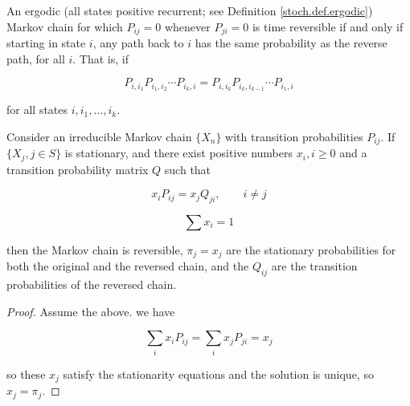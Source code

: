 \begin{theorem}An ergodic (all states positive recurrent; see Definition \ref{stoch.def.ergodic}) Markov chain for which \(P_{ij}=0\) whenever \(P_{ji}=0\) is time reversible if and only if starting in state \(i\), any path back to \(i\) has the same probability as the reverse path, for all \(i\). That is, if 

\[
P_{i,i_1}P_{i_1,i_2} \cdots P_{i_k,i} = P_{i,i_k} P_{i_k,i_{k-1}} \cdots P_{i_1, i}
\]

for all states \(i, i_1, \ldots, i_k\).

\end{theorem}

\begin{proposition}Consider an irreducible Markov chain \(\{X_n\}\) with transition probabilities \(P_{ij}\). If \(\{X_j, j \in S\}\) is stationary, and there exist positive numbers \(x_i, i \geq 0\) and a transition probability matrix \(Q\) such that

\[
x_i P_{ij} = x_j Q_{ji}, \qquad i \neq j
\]

\[
\sum x_i = 1
\]

then the Markov chain is reversible, \(\pi_j = x_j\) are the stationary probabilities for both the original and the reversed chain, and the \(Q_{ij}\) are the transition probabilities of the reversed chain.

\end{proposition}

\begin{proof}
Assume the above. we have

\[
\sum_i x_i P_{ij} = \sum_i x_j P_{ji} = x_j 
\]

so these \(x_j\) satisfy the stationarity equations and the solution is unique, so \(x_j = \pi_j\).
\end{proof}

\begin{example}

\end{example}

\begin{example}

\end{example}


